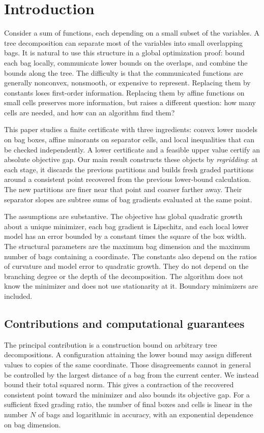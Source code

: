 \section{Introduction}\label{sec:introduction}
Consider a sum of functions, each depending on a small subset of the
variables. A tree decomposition can separate most of the variables into
small overlapping bags. It is natural to use this structure in a global
optimization proof: bound each bag locally, communicate lower bounds on
the overlaps, and combine the bounds along the tree. The difficulty is
that the communicated functions are generally nonconvex, nonsmooth, or
expensive to represent. Replacing them by constants loses first-order
information. Replacing them by affine functions on small cells preserves
more information, but raises a different question: how many cells are
needed, and how can an algorithm find them?

This paper studies a finite certificate with three ingredients: convex
lower models on bag boxes, affine minorants on separator cells, and local
inequalities that can be checked independently. A lower certificate and
a feasible upper value certify an absolute objective gap. Our main result
constructs these objects by \emph{regridding}: at each stage, it discards
the previous partitions and builds fresh graded partitions around a
consistent point recovered from the previous lower-bound calculation.
The new partitions are finer near that point and coarser farther away.
Their separator slopes are subtree sums of bag gradients evaluated at
the same point.

The assumptions are substantive. The objective has global quadratic
growth about a unique minimizer, each bag gradient is Lipschitz, and each
local lower model has an error bounded by a constant times the square of
the box width. The structural parameters are the maximum bag dimension
and the maximum number of bags containing a coordinate. The constants
also depend on the ratios of curvature and model error to quadratic
growth. They do not depend on the branching degree or the depth of the
decomposition. The algorithm does not know the minimizer and does not
use stationarity at it. Boundary minimizers are included.

\subsection{Contributions and computational guarantees}
The principal contribution is a construction bound on arbitrary tree
decompositions. A configuration attaining the lower bound may assign
different values to copies of the same coordinate. Those disagreements
cannot in general be controlled by the largest distance of a bag from the
current center. We instead bound their total squared norm. This gives a
contraction of the recovered consistent point toward the minimizer and
also bounds its objective gap. For a sufficient fixed grading ratio, the
number of final boxes and cells is linear in the number $N$ of bags and
logarithmic in accuracy, with an exponential dependence on bag dimension.

